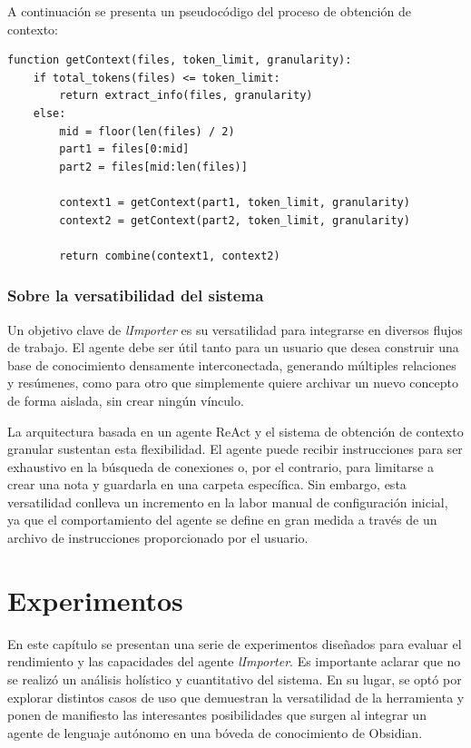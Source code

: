 A continuación se presenta un pseudocódigo del proceso de obtención de contexto:

\begin{verbatim}
function getContext(files, token_limit, granularity):
    if total_tokens(files) <= token_limit:
        return extract_info(files, granularity)
    else:
        mid = floor(len(files) / 2)
        part1 = files[0:mid]
        part2 = files[mid:len(files)]
        
        context1 = getContext(part1, token_limit, granularity)
        context2 = getContext(part2, token_limit, granularity)
        
        return combine(context1, context2)
\end{verbatim}

\subsection{Sobre la versatibilidad del sistema}
Un objetivo clave de \textit{lImporter} es su versatilidad para integrarse en diversos flujos de trabajo. El agente debe ser útil tanto para un usuario que desea construir una base de conocimiento densamente interconectada, generando múltiples relaciones y resúmenes, como para otro que simplemente quiere archivar un nuevo concepto de forma aislada, sin crear ningún vínculo.

La arquitectura basada en un agente ReAct y el sistema de obtención de contexto granular sustentan esta flexibilidad. El agente puede recibir instrucciones para ser exhaustivo en la búsqueda de conexiones o, por el contrario, para limitarse a crear una nota y guardarla en una carpeta específica. Sin embargo, esta versatilidad conlleva un incremento en la labor manual de configuración inicial, ya que el comportamiento del agente se define en gran medida a través de un archivo de instrucciones proporcionado por el usuario.

\chapter{Experimentos}\label{chapter:implementation}
En este capítulo se presentan una serie de experimentos diseñados para evaluar el rendimiento y las capacidades del agente \textit{lImporter}. Es importante aclarar que no se realizó un análisis holístico y cuantitativo del sistema. En su lugar, se optó por explorar distintos casos de uso que demuestran la versatilidad de la herramienta y ponen de manifiesto las interesantes posibilidades que surgen al integrar un agente de lenguaje autónomo en una bóveda de conocimiento de Obsidian.

